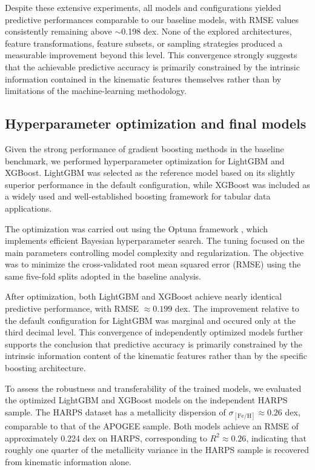 \documentclass{aa}
\begin{document}
Despite these extensive experiments, all models and configurations yielded predictive performances comparable to our baseline models, with RMSE values consistently remaining above $\sim$0.198 dex. None of the explored architectures, feature transformations, feature subsets, or sampling strategies produced a measurable improvement beyond this level. This convergence strongly suggests that the achievable predictive accuracy is primarily constrained by the intrinsic information contained in the kinematic features themselves rather than by limitations of the machine-learning methodology.


\subsection{Hyperparameter optimization and final models}

Given the strong performance of gradient boosting methods in the baseline benchmark, we performed hyperparameter optimization for LightGBM and XGBoost. LightGBM was selected as the reference model based on its slightly superior performance in the default configuration, while XGBoost was included as a widely used and well-established boosting framework for tabular data applications.

The optimization was carried out using the Optuna framework \citep{Akiba-19}, which implements efficient Bayesian hyperparameter search. The tuning focused on the main parameters controlling model complexity and regularization. The objective was to minimize the cross-validated root mean squared error (RMSE) using the same five-fold splits adopted in the baseline analysis.

After optimization, both LightGBM and XGBoost achieve nearly identical predictive performance, with RMSE $\approx 0.199$ dex. The improvement relative to the default configuration for LightGBM was marginal and occured only at the third decimal level. This convergence of independently optimized models further supports the conclusion that predictive accuracy is primarily constrained by the intrinsic information content of the kinematic features rather than by the specific boosting architecture.

To assess the robustness and transferability of the trained models, we evaluated the optimized LightGBM and XGBoost models on the independent HARPS sample. The HARPS dataset has a metallicity dispersion of $\sigma_{\mathrm{[Fe/H]}} \approx 0.26$ dex, comparable to that of the APOGEE sample. Both models achieve an RMSE of approximately 0.224 dex on HARPS, corresponding to $R^2 \approx 0.26$, indicating that roughly one quarter of the metallicity variance in the HARPS sample is recovered from kinematic information alone.
\end{document}
